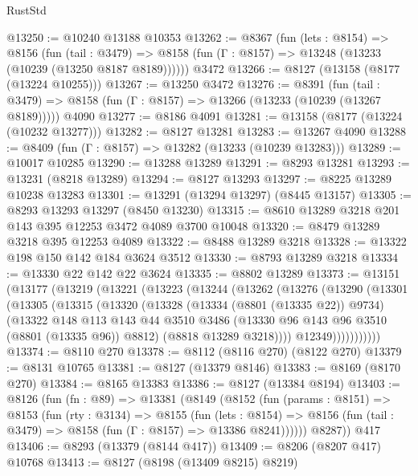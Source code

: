 \begin{lexlean}{RustStd}
\begin{coremodule}
@13250 := @10240 @13188 @10353
@13262 := @8367
    (fun (lets : @8154) =>
    @8156
      (fun (tail : @3479) =>
      @8158 (fun (Γ : @8157) => @13248 (@13233 (@10239 (@13250 @8187 @8189))))))
    @3472
@13266 := @8127 (@13158 (@8177 (@13224 @10255)))
@13267 := @13250 @3472
@13276 := @8391
    (fun (tail : @3479) => @8158 (fun (Γ : @8157) => @13266 (@13233 (@10239 (@13267 @8189)))))
    @4090
@13277 := @8186 @4091
@13281 := @13158 (@8177 (@13224 (@10232 @13277)))
@13282 := @8127 @13281
@13283 := @13267 @4090
@13288 := @8409 (fun (Γ : @8157) => @13282 (@13233 (@10239 @13283)))
@13289 := @10017 @10285
@13290 := @13288 @13289
@13291 := @8293 @13281
@13293 := @13231 (@8218 @13289)
@13294 := @8127 @13293
@13297 := @8225 @13289 @10238 @13283
@13301 := @13291 (@13294 @13297) (@8445 @13157)
@13305 := @8293 @13293 @13297 (@8450 @13230)
@13315 := @8610 @13289 @3218 @201 @143 @395 @12253 @3472 @4089 @3700 @10048
@13320 := @8479 @13289 @3218 @395 @12253 @4089
@13322 := @8488 @13289 @3218
@13328 := @13322 @198 @150 @142 @184 @3624 @3512
@13330 := @8793 @13289 @3218
@13334 := @13330 @22 @142 @22 @3624
@13335 := @8802 @13289
@13373 := @13151
    (@13177
      (@13219
        (@13221
          (@13223
            (@13244
              (@13262
                (@13276
                  (@13290
                    (@13301
                      (@13305
                        (@13315
                          (@13320
                            (@13328
                              (@13334 (@8801 (@13335 @22)) @9734)
                              (@13322
                                @148
                                @113
                                @143
                                @44
                                @3510
                                @3486
                                (@13330 @96 @143 @96 @3510 (@8801 (@13335 @96)) @8812)
                                (@8818 @13289 @3218))))
                          @12349)))))))))))
@13374 := @8110 @270
@13378 := @8112 (@8116 @270) (@8122 @270)
@13379 := @8131 @10765
@13381 := @8127 (@13379 @8146)
@13383 := @8169 (@8170 @270)
@13384 := @8165 @13383
@13386 := @8127 (@13384 @8194)
@13403 := @8126
    (fun (fn : @89) =>
    @13381
      (@8149
        (@8152
          (fun (params : @8151) =>
          @8153
            (fun (rty : @3134) =>
            @8155
              (fun (lets : @8154) =>
              @8156 (fun (tail : @3479) => @8158 (fun (Γ : @8157) => @13386 @8241))))))
        @8287))
    @417
@13406 := @8293 (@13379 (@8144 @417))
@13409 := @8206 (@8207 @417) @10768
@13413 := @8127 (@8198 (@13409 @8215) @8219)

\end{coremodule}
\end{lexlean}
